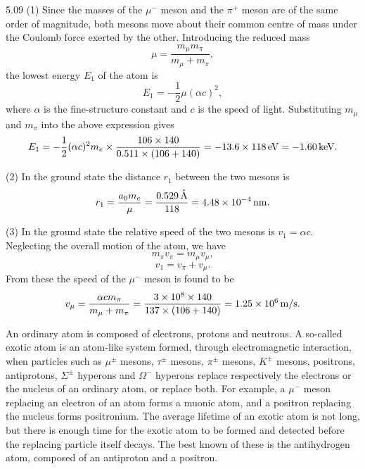 \begin{solution}{5.09}
(1) Since the masses of the $\mu^-$ meson and the $\pi^+$ meson are of the same order of
magnitude, both mesons move about their common centre of mass under the Coulomb force exerted
by the other. Introducing the reduced mass
\begin{equation*}
\mu = \frac{m_\mu m_\pi}{m_\mu + m_\pi},
\end{equation*}
the lowest energy $E_1$ of the atom is
\begin{equation*}
E_1 = -\frac{1}{2}\mu(\alpha c)^2,
\end{equation*}
where $\alpha$ is the fine-structure constant and $c$ is the speed of light. Substituting
$m_\mu$ and $m_\pi$ into the above expression gives
\begin{equation*}
E_1 = -\frac{1}{2}(\alpha c)^2m_e\times\frac{106\times 140}{0.511\times(106 + 140)}
    = -13.6\times 118\,\mathrm{eV} = -1.60\,\mathrm{keV}.
\end{equation*}

(2) In the ground state the distance $r_1$ between the two mesons is
\begin{equation*}
r_1 = \frac{a_0m_e}{\mu} = \frac{0.529\,\mathrm{\mathring{A}}}{118}
    = 4.48\times 10^{-4}\,\mathrm{nm}.
\end{equation*}

(3) In the ground state the relative speed of the two mesons is $v_1 = \alpha c$. Neglecting
the overall motion of the atom, we have
\begin{equation*}
m_\pi v_\pi = m_\mu v_\mu,
\end{equation*}
\begin{equation*}
v_1 = v_\pi + v_\mu.
\end{equation*}
From these the speed of the $\mu^-$ meson is found to be
\begin{equation*}
v_\mu = \frac{\alpha cm_\pi}{m_\mu + m_\pi}
     = \frac{3\times 10^8\times 140}{137\times(106 + 140)}
     = 1.25\times 10^6\,\mathrm{m/s}.
\end{equation*}

\begin{commentary}
An ordinary atom is composed of electrons, protons and neutrons. A so-called exotic atom is
an atom-like system formed, through electromagnetic interaction, when particles such as
$\mu^\pm$ mesons, $\tau^\pm$ mesons, $\pi^\pm$ mesons, $K^\pm$ mesons, positrons,
antiprotons, $\Sigma^\pm$ hyperons and $\Omega^-$ hyperons replace respectively the electrons
or the nucleus of an ordinary atom, or replace both. For example, a $\mu^-$ meson replacing an
electron of an atom forms a muonic atom, and a positron replacing the nucleus forms
positronium. The average lifetime of an exotic atom is not long, but there is enough time for
the exotic atom to be formed and detected before the replacing particle itself decays. The
best known of these is the antihydrogen atom, composed of an antiproton and a positron.
\end{commentary}
\end{solution}

